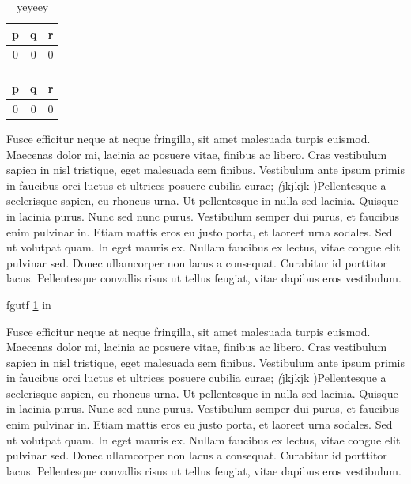 \documentclass[letterpaper,12pt]{book}
\begin{document}
	\begin{table}
		\begin{tabular}{|cc|c}
			p & q & r \\
			\hline
			0 & 0 & 0
		\end{tabular}
		\caption{yeyeey}
		\label{table}
	\end{table}
	\begin{tabular}{cc|c}
		p & q & r \\
		\hline
		0 & 0 & 0
	\end{tabular}
	
	\begin{center}
			\noindent Fusce efficitur neque at neque fringilla, sit amet malesuada turpis euismod. Maecenas dolor mi, lacinia ac posuere vitae, finibus ac libero. Cras vestibulum sapien in nisl tristique, eget malesuada sem finibus. Vestibulum ante ipsum primis in faucibus orci luctus et ultrices posuere cubilia curae; \textit(jkjkjk )Pellentesque a scelerisque sapien, eu rhoncus urna. Ut pellentesque in nulla sed lacinia. Quisque in lacinia purus. Nunc sed nunc purus. Vestibulum semper dui purus, et faucibus enim pulvinar in. Etiam mattis eros eu justo porta, et laoreet urna sodales. Sed ut volutpat quam. In eget mauris ex. Nullam faucibus ex lectus, vitae congue elit pulvinar sed. Donec ullamcorper non lacus a   consequat. Curabitur id porttitor lacus. Pellentesque convallis risus ut tellus feugiat, vitae dapibus eros vestibulum. \vspace{5cm}
	\end{center}

	fgutf
	\ref{table} in \pageref{table}
	


	\begin{center}
		\noindent Fusce efficitur neque at neque fringilla, sit amet malesuada turpis euismod. Maecenas dolor mi, lacinia ac posuere vitae, finibus ac libero. Cras vestibulum sapien in nisl tristique, eget malesuada sem finibus. Vestibulum ante ipsum primis in faucibus orci luctus et ultrices posuere cubilia curae; \textit(jkjkjk )Pellentesque a scelerisque sapien, eu rhoncus urna. Ut pellentesque in nulla sed lacinia. Quisque in lacinia purus. Nunc sed nunc purus. Vestibulum semper dui purus, et faucibus enim pulvinar in. Etiam mattis eros eu justo porta, et laoreet urna sodales. Sed ut volutpat quam. In eget mauris ex. Nullam faucibus ex lectus, vitae congue elit pulvinar sed. Donec ullamcorper non lacus a   consequat. Curabitur id porttitor lacus. Pellentesque convallis risus ut tellus feugiat, vitae dapibus eros vestibulum. \vspace{5cm}
	\end{center}	
\end{document}
